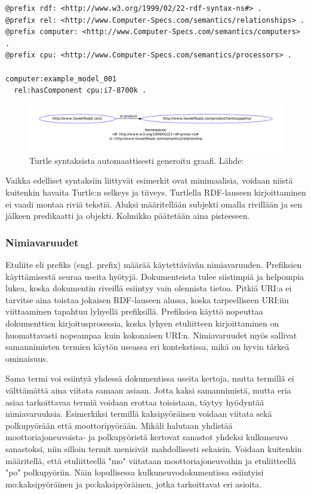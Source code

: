 \documentclass[finnish, 12pt, a4paper, elec, utf8, pdfa, online]{aaltothesis}
\begin{document}
\vskip 0.75cm
\begin{lstlisting}[style=codeblock]
@prefix rdf: <http://www.w3.org/1999/02/22-rdf-syntax-ns#> .
@prefix rel: <http://www.Computer-Specs.com/semantics/relationships> .
@prefix computer: <http://www.Computer-Specs.com/semantics/computers> .
@prefix cpu: <http://www.Computer-Specs.com/semantics/processors> .

computer:example_model_001
  rel:hasComponent cpu:i7-8700k .

\end{lstlisting}
\vskip 0.75cm

\begin{figure}[htb]
\centering
\includegraphics[width=15cm]{images/RDF-triplet2.pdf}
\caption{Turtle syntaksista automaattisesti generoitu graafi. Lähde: \cite{SeCo_RDF_validator} \label{images/RDF-triplet2}}
\end{figure}

Vaikka edelliset syntaksiin liittyvät esimerkit ovat minimaalisia, voidaan niistä kuitenkin havaita Turtle:n selkeys ja tiiveys. Turtlella RDF-lauseen kirjoittaminen ei vaadi montaa riviä tekstiä. Aluksi määritellään subjekti omalla rivillään ja sen jälkeen predikaatti ja objekti. Kolmikko päätetään aina pisteeseen.


\subsubsection{Nimiavaruudet}
Etuliite eli prefiks (engl. prefix) määrää käytettävävän nimiavaruuden. Prefiksien käyttämisestä seuraa useita hyötyjä. Dokumenteista tulee siistimpiä ja helpompia lukea, koska dokumentin riveillä esiintyy vain olennista tietoa. Pitkiä URI:a ei tarvitse aina toistaa jokaisen RDF-lauseen alussa, koska tarpeelliseen URI:iin viittaaminen tapahtuu lyhyellä prefiksillä. Prefiksien käyttö nopeuttaa dokumenttien kirjoitusprosessia, koska lyhyen etuliitteen kirjoittaminen on huomattavasti nopeampaa kuin kokonaisen URI:n. Nimiavaruudet myös sallivat samannimisten termien käytön useassa eri kontekstissa, mikä on hyvin tärkeä ominaisuus.

Sama termi voi esiintyä yhdessä dokumentissa useita kertoja, mutta termillä ei välttämättä aina viitata samaan asiaan. Jotta kaksi samannimistä, mutta eria asiaa tarkoittavaa termiä voidaan erottaa toisistaan, täytyy hyödyntää nimiavaruuksia. Esimerkiksi termillä kaksipyöräinen voidaan viitata sekä polkupyörään että moottoripyörään. Mikäli halutaan yhdistää moottoriajoneuvoista- ja polkupyöristä kertovat sanastot yhdeksi kulkuneuvo sanastoksi, niin silloin termit menisivät mahdollisesti sekaisin. Voidaan kuitenkin määritellä, että etuliitteellä "mo" viitataan moottoriajoneuvoihin ja etuliitteellä "po" polkupyöriin. Näin lopullisessa kulkuneuvodokumentissa esiintyisi mo:kaksipyöräinen ja po:kaksipyöräinen, jotka tarkoittavat eri asioita.
\end{document}
